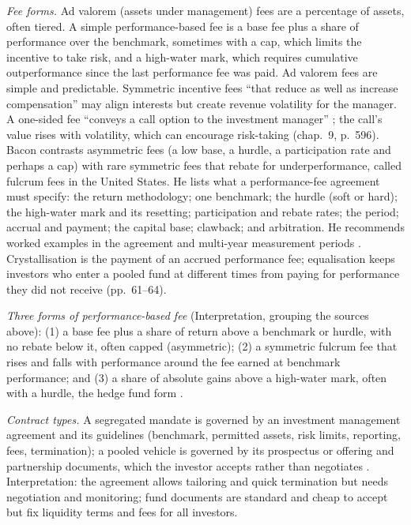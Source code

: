 \begin{qfmethod}\label{meth:vehicle-contract-fee-analysis}
 \emph{Fee forms.} Ad valorem (assets under management) fees are a percentage of assets, often tiered. A simple performance-based fee is a base fee plus a share of performance over the benchmark, sometimes with a cap, which limits the incentive to take risk, and a high-water mark, which requires cumulative outperformance since the last performance fee was paid. Ad valorem fees are simple and predictable. Symmetric incentive fees ``that reduce as well as increase compensation'' may align interests but create revenue volatility for the manager. A one-sided fee ``conveys a call option to the investment manager'' \citep[chap.~7, p.~467]{managing-investment-portfolios-2007}; the call's value rises with volatility, which can encourage risk-taking (chap.~9, p.~596). Bacon contrasts asymmetric fees (a low base, a hurdle, a participation rate and perhaps a cap) with rare symmetric fees that rebate for underperformance, called fulcrum fees in the United States. He lists what a performance-fee agreement must specify: the return methodology; one benchmark; the hurdle (soft or hard); the high-water mark and its resetting; participation and rebate rates; the period; accrual and payment; the capital base; clawback; and arbitration. He recommends worked examples in the agreement and multi-year measurement periods \citep[3rd ed., 2023, chap.~3, pp.~59--63]{wide-bacon-attribution}. Crystallisation is the payment of an accrued performance fee; equalisation keeps investors who enter a pooled fund at different times from paying for performance they did not receive (pp.~61--64).

\emph{Three forms of performance-based fee} (Interpretation, grouping the sources above): (1) a base fee plus a share of return above a benchmark or hurdle, with no rebate below it, often capped (asymmetric); (2) a symmetric fulcrum fee that rises and falls with performance around the fee earned at benchmark performance; and (3) a share of absolute gains above a high-water mark, often with a hurdle, the hedge fund form \citep[chap.~17, pp.~581--582]{s7-ang}.

\emph{Contract types.} A segregated mandate is governed by an investment management agreement and its guidelines (benchmark, permitted assets, risk limits, reporting, fees, termination); a pooled vehicle is governed by its prospectus or offering and partnership documents, which the investor accepts rather than negotiates \citep[chap.~1, pp.~2--3]{managing-investment-portfolios-2007}. Interpretation: the agreement allows tailoring and quick termination but needs negotiation and monitoring; fund documents are standard and cheap to accept but fix liquidity terms and fees for all investors.


\end{qfmethod}
